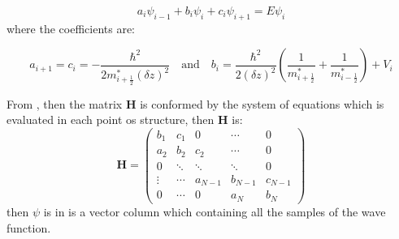 \begin{equation}\label{eqn:chapter-2-sec-numerical-calculations-schrodinger-discrete-to-matrix}
	a_{i}\psi_{i-1}+b_{i}\psi_{i}+c_{i}\psi_{i+1}=E\psi_{i}
\end{equation}
where the coefficients are:

\begin{equation}\label{eqn:chapter-2-sec-numerical-calculations-schrodinger-discrete-to-matrix-coefficients}
	a_{i+1}=c_{i}= -\dfrac{\hbar^2}{2m^{*}_{i+\frac{1}{2}}(\delta z)^2} \quad \text{and}\quad b_{i}=\dfrac{\hbar^{2}}{2(\delta z)^2}\left(\dfrac{1}{m^{*}_{i+\frac{1}{2}}}+\dfrac{1}{m^{*}_{i-\frac{1}{2}}}\right)+V_{i}
\end{equation}

From , then the matrix \textbf{H} is conformed by the system of equations which is evaluated in each point os structure, then \textbf{H} is:  
\begin{equation}
	\textbf{H}=\begin{pmatrix}
		b_{1} & c_{1} & 0      &\cdots & 0\\
		a_{2} & b_{2} & c_{2}  &\cdots &0\\
		0     &\ddots &\ddots  &\ddots&0\\
		\vdots&\cdots &a_{N-1} &b_{N-1}&c_{N-1}\\
		0     &\cdots&0        &a_{N}  &b_{N} 
	\end{pmatrix}
\end{equation}
then $\psi$ is in  is a vector column which containing all the samples of the wave function. 

